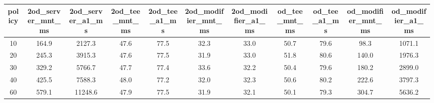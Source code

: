 \begin{tabular}{c c c c c c c c c c c}
\toprule
policy & 2od\_server\_mnt\_ms & 2od\_server\_a1\_ms & 2od\_tee\_mnt\_ms & 2od\_tee\_a1\_ms & 2od\_modifier\_mnt\_ms & 2od\_modifier\_a1\_ms & od\_tee\_mnt\_ms & od\_tee\_a1\_ms & od\_modifier\_mnt\_ms & od\_modifier\_a1\_ms \\
\midrule
10 & 164.9 & 2127.3 & 47.6 & 77.5 & 32.3 & 33.0 & 50.7 & 79.6 & 98.3 & 1071.1 \\
20 & 245.3 & 3915.3 & 47.6 & 77.5 & 31.9 & 33.0 & 51.8 & 80.6 & 140.0 & 1976.3 \\
30 & 329.2 & 5766.7 & 47.7 & 77.4 & 33.6 & 32.2 & 50.4 & 79.6 & 180.2 & 2899.0 \\
40 & 425.5 & 7588.3 & 48.0 & 77.2 & 32.0 & 32.3 & 50.6 & 80.2 & 222.6 & 3797.3 \\
60 & 579.1 & 11248.6 & 47.9 & 77.5 & 31.9 & 32.1 & 50.1 & 79.3 & 304.7 & 5636.2 \\
\bottomrule
\end{tabular}
